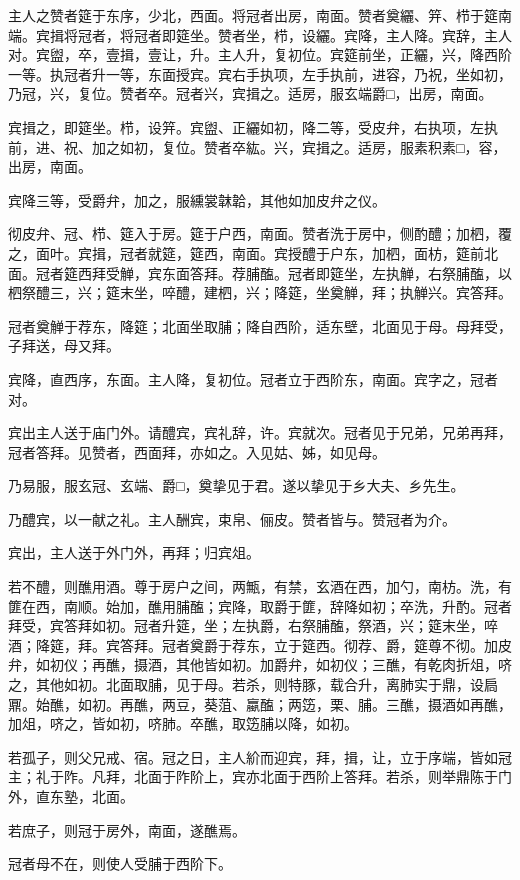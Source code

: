 \documentclass[]{article}
\begin{document}
主人之赞者筵于东序，少北，西面。将冠者出房，南面。赞者奠纚、笄、栉于筵南端。宾揖将冠者，将冠者即筵坐。赞者坐，栉，设纚。宾降，主人降。宾辞，主人对。宾盥，卒，壹揖，壹让，升。主人升，复初位。宾筵前坐，正纚，兴，降西阶一等。执冠者升一等，东面授宾。宾右手执项，左手执前，进容，乃祝，坐如初，乃冠，兴，复位。赞者卒。冠者兴，宾揖之。适房，服玄端爵□，出房，南面。

宾揖之，即筵坐。栉，设笄。宾盥、正纚如初，降二等，受皮弁，右执项，左执前，进、祝、加之如初，复位。赞者卒紘。兴，宾揖之。适房，服素积素□，容，出房，南面。

宾降三等，受爵弁，加之，服纁裳韎韐，其他如加皮弁之仪。

彻皮弁、冠、栉、筵入于房。筵于户西，南面。赞者洗于房中，侧酌醴；加柶，覆之，面叶。宾揖，冠者就筵，筵西，南面。宾授醴于户东，加柶，面枋，筵前北面。冠者筵西拜受觯，宾东面答拜。荐脯醢。冠者即筵坐，左执觯，右祭脯醢，以柶祭醴三，兴；筵末坐，啐醴，建柶，兴；降筵，坐奠觯，拜；执觯兴。宾答拜。

冠者奠觯于荐东，降筵；北面坐取脯；降自西阶，适东壁，北面见于母。母拜受，子拜送，母又拜。

宾降，直西序，东面。主人降，复初位。冠者立于西阶东，南面。宾字之，冠者对。

宾出主人送于庙门外。请醴宾，宾礼辞，许。宾就次。冠者见于兄弟，兄弟再拜，冠者答拜。见赞者，西面拜，亦如之。入见姑、姊，如见母。

乃易服，服玄冠、玄端、爵□，奠挚见于君。遂以挚见于乡大夫、乡先生。

乃醴宾，以一献之礼。主人酬宾，束帛、俪皮。赞者皆与。赞冠者为介。

宾出，主人送于外门外，再拜；归宾俎。

若不醴，则醮用酒。尊于房户之间，两甒，有禁，玄酒在西，加勺，南枋。洗，有篚在西，南顺。始加，醮用脯醢；宾降，取爵于篚，辞降如初；卒洗，升酌。冠者拜受，宾答拜如初。冠者升筵，坐；左执爵，右祭脯醢，祭酒，兴；筵末坐，啐酒；降筵，拜。宾答拜。冠者奠爵于荐东，立于筵西。彻荐、爵，筵尊不彻。加皮弁，如初仪；再醮，摄酒，其他皆如初。加爵弁，如初仪；三醮，有乾肉折俎，哜之，其他如初。北面取脯，见于母。若杀，则特豚，载合升，离肺实于鼎，设扃鼏。始醮，如初。再醮，两豆，葵菹、蠃醢；两笾，栗、脯。三醮，摄酒如再醮，加俎，哜之，皆如初，哜肺。卒醮，取笾脯以降，如初。

若孤子，则父兄戒、宿。冠之日，主人紒而迎宾，拜，揖，让，立于序端，皆如冠主；礼于阼。凡拜，北面于阼阶上，宾亦北面于西阶上答拜。若杀，则举鼎陈于门外，直东塾，北面。

若庶子，则冠于房外，南面，遂醮焉。

冠者母不在，则使人受脯于西阶下。
\end{document}
